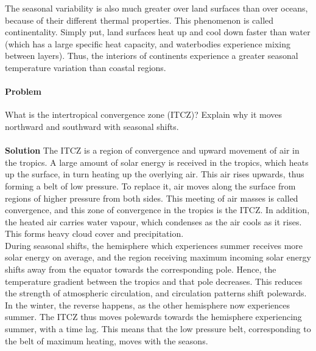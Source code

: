 \documentclass[10pt]{article}
\newcounter{prob}
\def\problem{\stepcounter{prob}\paragraph{Problem \arabic{prob}}}
\def\solution{\\\\\textbf{Solution }}
\begin{document}
        The seasonal variability is also much greater over land surfaces than over oceans, because of their different thermal properties.
        This phenomenon is called continentality. Simply put, land surfaces heat up and cool down faster than water (which has a large
        specific heat capacity, and waterbodies experience mixing between layers). Thus, the interiors of continents experience
        a greater seasonal temperature variation than coastal regions.

        \problem What is the intertropical convergence zone (ITCZ)? Explain why it moves northward and southward with seasonal shifts.
        \solution The ITCZ is a region of convergence and upward movement of air in the tropics. A large amount of solar energy is
        received in the tropics, which heats up the surface, in turn heating up the overlying air. This air rises upwards, thus forming a 
        belt of low pressure. To replace it, air moves along the surface from regions of higher pressure from both sides. This meeting
        of air masses is called convergence, and this zone of convergence in the tropics is the ITCZ. In addition, the heated air carries
        water vapour, which condenses as the air cools as it rises. This forms heavy cloud cover and precipitation.\\

        During seasonal shifts, the hemisphere which experiences summer receives more solar energy on average, and the region receiving
        maximum incoming solar energy shifts away from the equator towards the corresponding pole. Hence, the temperature gradient between
        the tropics and that pole decreases. This reduces the strength of atmospheric circulation, and circulation patterns shift polewards.
        In the winter, the reverse happens, as the other hemisphere now experiences summer. The ITCZ thus moves polewards towards the 
        hemisphere experiencing summer, with a time lag. This means that the low pressure belt, corresponding to the belt of maximum heating,
        moves with the seasons.
\end{document}

